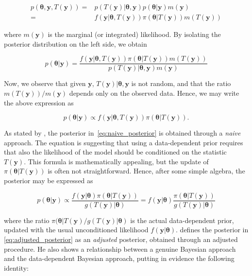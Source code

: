 \documentclass{statsoc}
\begin{document}
\begin{align*}
p( \bm{\theta}, \bm{y}, T( \bm{y}))= & p( T( \bm{y})| \bm{\theta}, \bm{y})p( \bm{\theta}| \bm{y}) m( \bm{y}) \\
= & f(\bm{y}|\bm{\theta}, T( \bm{y})   )\pi(\bm{\theta}| T( \bm{y}))m( T( \bm{y}))
\end{align*}

where $m(\bm{y})$ is the marginal (or integrated) likelihood. By isolating the posterior distribution on the left side, we obtain

\begin{equation}
p( \bm{\theta}| \bm{y})= \frac{f(\bm{y}|\bm{\theta}, T( \bm{y})   )\pi(\bm{\theta}| T( \bm{y}))m( T( \bm{y}))}{p( T( \bm{y})| \bm{\theta}, \bm{y})m( \bm{y})}
\end{equation}


Now, we observe that given $\bm{y}$, $T( \bm{y})| \bm{\theta}, \bm{y} $ is not random, and that the ratio $m( T( \bm{y}))/m( \bm{y})$ depends only on the observed data. Hence, we may write the above expression as

\begin{equation}
p( \bm{\theta}| \bm{y}) \propto f(\bm{y}|\bm{\theta}, T( \bm{y})   )\pi(\bm{\theta}| T( \bm{y})).
\label{eq:naive_posterior}
\end{equation}

As stated by \cite{darnieder2011bayesian}, the posterior in~\eqref{eq:naive_posterior} is obtained through a \textit{naive} approach. The equation is suggesting that using a data-dependent prior requires that also the likelihood of the model should be conditioned on the statistic $T( \bm{y})$. This formula is mathematically appealing, but the update of $\pi(\bm{\theta}| T( \bm{y}))$ is often not straightforward. Hence, after some simple algebra, the posterior may be expressed as

\begin{equation}
p( \bm{\theta}| \bm{y}) \propto \frac{f(\bm{y}|\bm{\theta}   )\pi(\bm{\theta}| T( \bm{y}))}{ g( T( \bm{y})| \bm{\theta}) }=f(\bm{y}|\bm{\theta}   ) \frac{\pi(\bm{\theta}| T( \bm{y}))}{g( T( \bm{y})| \bm{\theta})}
\label{eq:adjusted_posterior}
\end{equation}

where the ratio $\pi(\bm{\theta}| T( \bm{y})/g( T( \bm{y})| \bm{\theta})$ is the actual data-dependent prior, updated with the usual unconditioned likelihood $f(\bm{y}|\bm{\theta})$. \cite{darnieder2011bayesian} defines the posterior in \eqref{eq:adjusted_posterior} as an \textit{adjusted} posterior, obtained through an adjusted procedure. He also shows a relationship between a genuine Bayesian approach and the data-dependent Bayesian approach, putting in evidence the following identity:
\end{document}
